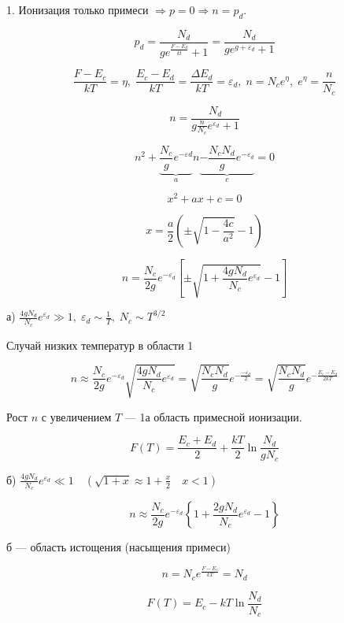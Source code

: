1. Ионизация только примеси $\Rightarrow p=0 \Rightarrow n=p_d$.

$$\displaystyle p_d=\frac{N_d}{ge^{\frac{F-E_d}{kt}}+1} = \frac{N_d}{g e^{g+\varepsilon_d}+1}$$


$$\displaystyle \frac{F-E_c}{kT} = \eta, \; \frac{E_c-E_d}{kT}=\frac{\Delta E_d}{kT} = \varepsilon_d, \; n=N_c e^\eta, \; e^\eta = \frac{n}{N_c}$$

$$n=\frac{N_{d}}{g \frac{n}{N_c} e^{\varepsilon_d}+1}$$

$$n^2+\underbrace{\frac{N_c}{g} e^{-\varepsilon d}}_a n \underbrace{-\frac{N_c N_d}{g} e^{-\varepsilon_d}}_c=0$$

$$x^2+ax+c=0$$

$$x=\frac{a}{2}\left( \pm \sqrt{1-\frac{4 c}{a^2}}-1\right)$$

$$
n=\frac{N_c}{2 g} e^{-\varepsilon_d}\left[ \pm \sqrt{1+\frac{4 g N_d}{N_c} e^{\varepsilon_d}}-1\right]
$$

\vspace{2cm}

а) $\displaystyle \frac{4gN_d}{N_c} e^{\varepsilon _d} \gg 1, \; \varepsilon_d \sim \frac{1}{T}, \; N_c \sim T^{3/2}$

\vspace{0.5cm}

Случай низких температур в области 1

$$
n \approx \frac{N_c}{2 g} e^{-\varepsilon_d} \sqrt{\frac{4 g N_d}{N_c} e^{\varepsilon_d}}=\sqrt{\frac{N_c N_d}{g}}e^{-\frac{-\varepsilon_d}{2}} = \sqrt{\frac{N_c N_d}{g}}e^{-\frac{E_c - E_d}{2kT}}
$$

Рост $n$ с увеличением $T$ --- 1а область примесной ионизации.

$$F(T) = \frac{E_c+E_d}{2} + \frac{kT}{2} \ln \frac{N_d}{g N_c}$$
\vspace{2cm}

б) $\displaystyle \frac{4 g N_d}{N_c} e^{\varepsilon_d} \ll 1 \quad\left(\sqrt{1+x} \approx 1+\frac{x}{2} \quad x<1\right)$

\vspace{0.5cm}

$$
n \approx \frac{N_c}{2 g} e^{-\varepsilon_d}\left\{1+\frac{2g N_d}{N_c} e^{\varepsilon_d}-1\right\}
$$

б --- область истощения (насыщения примеси)

$$
n=N_c e^{\frac{F-E_c}{k T}}=N_d
$$

$$
F(T)=E_c-k T \ln \frac{N_d}{N_c}
$$

